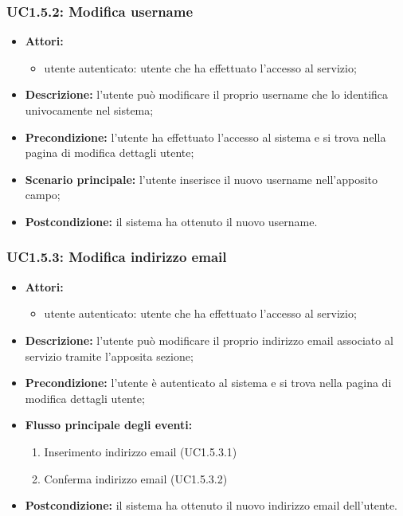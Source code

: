 \subsubsection{UC1.5.2: Modifica username}
\begin{itemize}
	\item \textbf{Attori:}
	\begin{itemize}
		\item utente autenticato: utente che ha effettuato l'accesso al servizio;
	\end{itemize}
	\item \textbf{Descrizione:} l'utente può modificare il proprio username che lo identifica univocamente nel sistema;
	\item \textbf{Precondizione:} l'utente ha effettuato l'accesso al sistema e si trova nella pagina di modifica dettagli utente;
	\item \textbf{Scenario principale:} l'utente inserisce il nuovo username nell'apposito campo;
	\item \textbf{Postcondizione:} il sistema ha ottenuto il nuovo username.
\end{itemize}

\subsubsection{UC1.5.3: Modifica indirizzo email}
\begin{itemize}
	\item \textbf{Attori:}
	\begin{itemize}
		\item utente autenticato: utente che ha effettuato l'accesso al servizio;
	\end{itemize}
	\item \textbf{Descrizione:} l'utente può modificare il proprio indirizzo email associato al servizio tramite l'apposita sezione;
	\item \textbf{Precondizione:} l'utente è autenticato al sistema e si trova nella pagina di modifica dettagli utente;
	\item \textbf{Flusso principale degli eventi:}
	\begin{enumerate}
		\item Inserimento indirizzo email (UC1.5.3.1)
		\item Conferma indirizzo email (UC1.5.3.2)
	\end{enumerate}
	\item \textbf{Postcondizione:} il sistema ha ottenuto il nuovo indirizzo email dell'utente.
\end{itemize}

